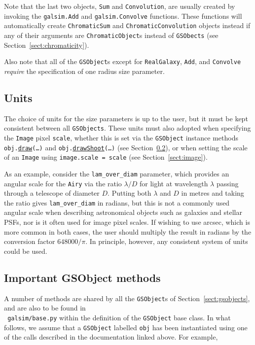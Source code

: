 \documentclass[preprint,11pt]{../../devel/modules/aastex}
\begin{document}
Note that the last two objects, \texttt{Sum} and \texttt{Convolution}, are usually created by
invoking the \texttt{galsim.Add} and \texttt{galsim.Convolve} functions.  These functions will
automatically create \texttt{ChromaticSum} and \texttt{ChromaticConvolution} objects instead if
any of their arguments are \texttt{ChromaticObject}s instead of
\texttt{GSObects} (see Section~\ref{sect:chromaticity}).

Also note that all of the \texttt{GSObject}s except for \texttt{RealGalaxy}, \texttt{Add}, and
\texttt{Convolve} {\em require} the specification of one radius size
parameter.

\subsection{Units}
The choice of units for the size parameters is up to the user,
but it must be kept consistent between all \texttt{GSObjects}.  These
units must also adopted when specifying the \texttt{Image} pixel
\texttt{scale}, whether this is set via the \texttt{GSObject}
instance methods \texttt{obj.}\href{http://galsim-developers.github.com/GalSim/classgalsim_1_1base_1_1_g_s_object.html#ae0b346a8b438dedbc7f60a52220869d8}{\texttt{draw}}\texttt{(\dots)}
and
\texttt{obj.}\href{http://galsim-developers.github.com/GalSim/classgalsim_1_1base_1_1_g_s_object.html#a42ac334d2840ba3fa832988e998beca0}{\texttt{drawShoot}}\texttt{(\dots)}
(see Section~\ref{sect:gsobjectmethods}),
or when setting the scale of an \texttt{Image}
using \texttt{image.scale = scale} (see Section~\ref{sect:image}).

As an example, consider the
\texttt{lam\_over\_diam} parameter, which provides an angular scale for
the \texttt{Airy} via
the ratio $\lambda / D$ for light at wavelength $\lambda$ passing
through a telescope of diameter $D$. Putting both $\lambda$ and
$D$ in metres and taking the ratio gives \texttt{lam\_over\_diam} in
radians, but this is not a commonly used angular scale when describing
astronomical objects such as galaxies and stellar PSFs, nor is
it often used for image pixel scales.  If wishing to use arcsec, which
is more common in both cases, the user should multiply the result in
radians by the conversion factor
$648000 / \pi$.  In principle, however, any consistent
system of units could be used.


\subsection{Important GSObject methods}\label{sect:gsobjectmethods}
A number of methods are shared by all the \texttt{GSObject}s of
Section~\ref{sect:gsobjects}, and are also to be found in \\ {\tt
 galsim/base.py} within the definition of the
\texttt{GSObject} base class.  In what follows, we assume that a
\texttt{GSObject} labelled \texttt{obj} has been instantiated using
one of the calls described in the documentation linked above.  For
example,
\end{document}
